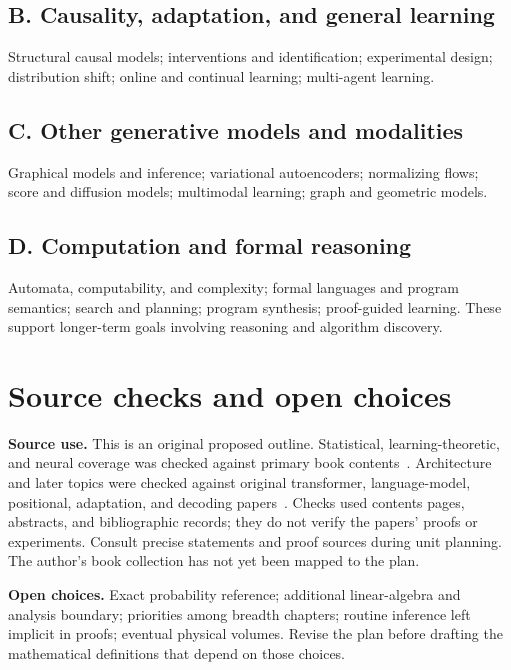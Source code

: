 \documentclass[11pt,oneside]{book}
\begin{document}
\section*{B. Causality, adaptation, and general learning}
Structural causal models; interventions and identification; experimental
design; distribution shift; online and continual learning; multi-agent learning.

\section*{C. Other generative models and modalities}
Graphical models and inference; variational autoencoders; normalizing flows;
score and diffusion models; multimodal learning; graph and geometric models.

\section*{D. Computation and formal reasoning}
Automata, computability, and complexity; formal languages and program semantics;
search and planning; program synthesis; proof-guided learning. These support
longer-term goals involving reasoning and algorithm discovery.

\chapter*{Source checks and open choices}

\textbf{Source use.} This is an original proposed outline. Statistical,
learning-theoretic, and neural coverage was checked against primary book
contents~\cite{wasserman,uml,dl}. Architecture and later topics were checked
against original transformer, language-model, positional, adaptation, and
decoding papers~\cite{attention,gpt,rope,lora,dpo,speculative,yun}.
Checks used contents pages, abstracts, and bibliographic records; they do not
verify the papers' proofs or experiments. Consult precise statements and proof
sources during unit planning. The author's book collection has not yet been
mapped to the plan.

\textbf{Open choices.} Exact probability reference; additional linear-algebra
and analysis boundary; priorities among breadth chapters; routine inference
left implicit in proofs; eventual physical volumes. Revise the plan before
drafting the mathematical definitions that depend on those choices.
\end{document}
